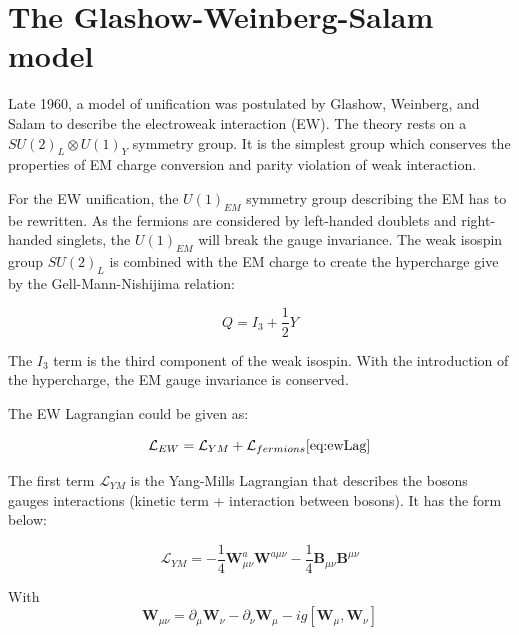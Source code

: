     \section{The Glashow-Weinberg-Salam model}

    Late 1960, a model of unification was postulated by Glashow, Weinberg, and Salam to describe the electroweak interaction (EW).
    The theory rests on a  $SU(2)_L \otimes U(1)_Y$ symmetry group.
    It is the simplest group which conserves the properties of EM charge conversion and parity violation of weak interaction.

    For the EW unification, the $U(1)_{EM}$ symmetry group describing the EM has to be rewritten.
    As the fermions are considered by left-handed doublets and right-handed singlets, the $U(1)_{EM}$ will break the gauge invariance.
    The weak isospin group $SU(2)_L$ is combined with the EM charge to create the hypercharge give by the Gell-Mann-Nishijima relation: 
  
    \begin{equation}
      Q = I_3 + \frac{1}{2}Y
    \end{equation}
   
    The $I_3$ term is the third component of the weak isospin.
    With the introduction of the hypercharge, the EM gauge invariance is conserved.

    The EW Lagrangian could be given as:

    \begin{equation}
      \mathcal{L}_{EW} = \mathcal{L}_{YM} + \mathcal{L}_{fermions} %
      \ref{eq:ewLag}
    \end{equation}

    The first term $\mathcal{L}_{YM}$ is the Yang-Mills Lagrangian that describes the bosons gauges interactions (kinetic term + interaction between bosons). 
    It has the form below:

    \begin{equation}
      \mathcal{L}_{YM} = - \frac{1}{4}\textbf{W}^a_{\mu\nu} \textbf{W}^{a\mu\nu} - \frac{1}{4}\textbf{B}_{\mu\nu}\textbf{B}^{\mu\nu}
    \end{equation}

    With 
    \begin{equation}
        \textbf{W}_{\mu\nu}  =  \partial_{\mu}\textbf{W}_{\nu} - \partial_{\nu}\textbf{W}_{\mu} - i g [\textbf{W}_{\mu},\textbf{W}_{\nu}]
      \label{eq:Wmunu}
    \end{equation}

